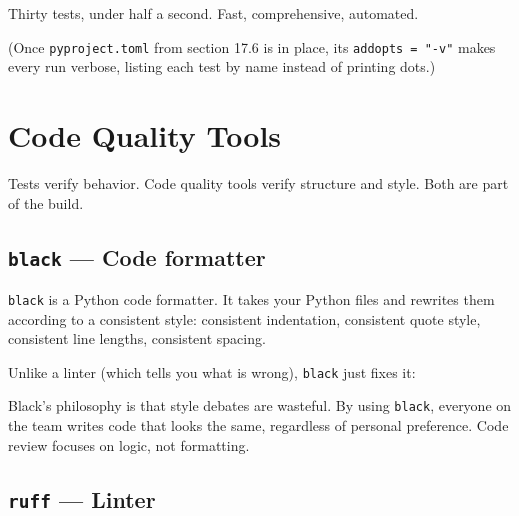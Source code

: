 \noindent{}Thirty tests, under half a second. Fast, comprehensive, automated.

(Once \texttt{pyproject.toml} from section 17.6 is in place, its \texttt{addopts\ =\ "-v"} makes every run verbose, listing each test by name instead of printing dots.)

\setcounter{section}{3}
\section{Code Quality Tools}\label{17-build-process:174-code-quality-tools}

Tests verify behavior. Code quality tools verify structure and style. Both are part of the build.

\subsection*{\texorpdfstring{\texttt{black} --- Code formatter}{black --- Code formatter}}\label{17-build-process:black--code-formatter}

\texttt{black} is a Python code formatter. It takes your Python files and rewrites them according to a consistent style: consistent indentation, consistent quote style, consistent line lengths, consistent spacing.

Unlike a linter (which tells you what is wrong), \texttt{black} just fixes it:

\begin{codebox}[short]

\begin{Shaded}
\begin{Highlighting}[]
 

\end{Highlighting}
\end{Shaded}

\end{codebox}

\noindent{}Black's philosophy is that style debates are wasteful. By using \texttt{black}, everyone on the team writes code that looks the same, regardless of personal preference. Code review focuses on logic, not formatting.

\subsection*{\texorpdfstring{\texttt{ruff} --- Linter}{ruff --- Linter}}\label{17-build-process:ruff--linter}

